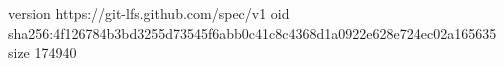 version https://git-lfs.github.com/spec/v1
oid sha256:4f126784b3bd3255d73545f6abb0c41c8c4368d1a0922e628e724ec02a165635
size 174940
